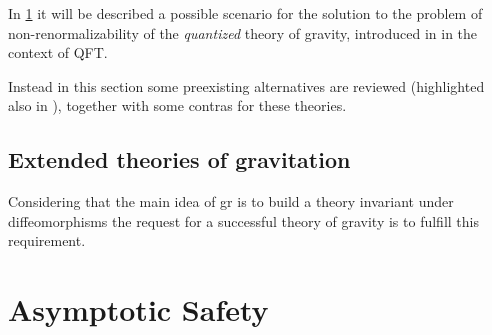 In \cref{sec:AsSty} it will be described a possible scenario for the solution to the problem of non-renormalizability of the \textit{quantized} theory of gravity, introduced in \cite{Weinberg1979} in the context of QFT.
\newline

Instead in this section some preexisting alternatives are reviewed (highlighted also in \cite{Weinberg1979}), together with some contras for these theories.


\subsection{Extended theories of gravitation}


Considering that the main idea of \acrshort{gr} is to build a theory invariant under diffeomorphisms the request for a successful theory of gravity is to fulfill this requirement.


\section{Asymptotic Safety}
\label{sec:AsSty}

